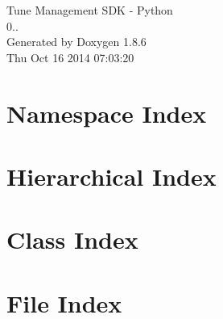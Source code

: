 \documentclass[twoside]{book}
\newcommand{\clearemptydoublepage}{%
  \newpage{\pagestyle{empty}\cleardoublepage}%
}
\begin{document}
\hypersetup{pageanchor=false}
\begin{titlepage}
\vspace*{7cm}
\begin{center}%
{\Large Tune Management S\-D\-K -\/ Python \\[1ex]\large 0.. }\\
\vspace*{1cm}
{\large Generated by Doxygen 1.8.6}\\
\vspace*{0.5cm}
{\small Thu Oct 16 2014 07:03:20}\\
\end{center}
\end{titlepage}
\clearemptydoublepage
\tableofcontents
\clearemptydoublepage
{}
\hypersetup{pageanchor=true}

\chapter{Namespace Index}

\chapter{Hierarchical Index}

\chapter{Class Index}

\chapter{File Index}

\end{document}
